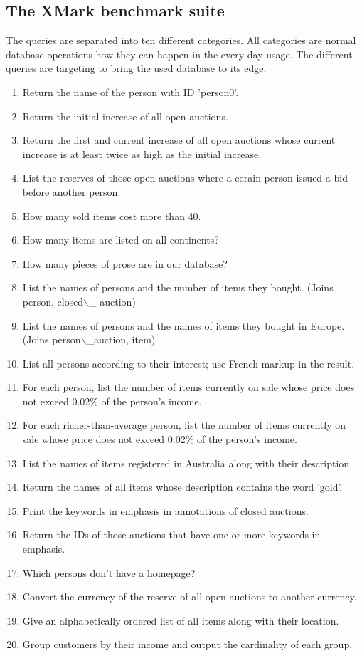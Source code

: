 \subsection{The XMark benchmark suite}
\label{subsec:the-xmark-benchmark-suite}
The queries are separated into ten different categories.
All categories are normal database operations how they can happen in the every day usage.
The different queries are targeting to bring the used database to its edge.

\begin{enumerate}
	\item Return the name of the person with ID 'person0'.
	\item Return the initial increase of all open auctions.
	\item Return the first and current increase of all open auctions whose current increase is at least twice as high as the initial increase.
	\item List the reserves of those open auctions where a cerain person issued a bid before another person.
	\item How many sold items cost more than 40.
	\item How many items are listed on all continents?
	\item How many pieces of prose are in our database?
	\item List the names of persons and the number of items they bought. (Joins person, closed$\backslash$\_ auction) 
	\item List the names of persons and the names of items they bought in Europe. (Joins person$\backslash$\_auction, item)
	\item List all persons according to their interest; use French markup in the result.
	\item For each person, list the number of items currently on sale whose price does not exceed 0.02\% of the person's income.
	\item For each richer-than-average person, list the number of items currently on sale whose price does not exceed 0.02\% of the person's income.
	\item List the names of items registered in Australia along with their description.
	\item Return the names of all items whose description contains the word 'gold'.
	\item Print the keywords in emphasis in annotations of closed auctions.
	\item Return the IDs of those auctions that have one or more keywords in emphasis.
	\item Which persons don't have a homepage?
	\item Convert the currency of the reserve of all open auctions to another currency.
	\item Give an alphabetically ordered list of all items along with their location.
	\item Group customers by their income and output the cardinality of each group.
\end{enumerate}




